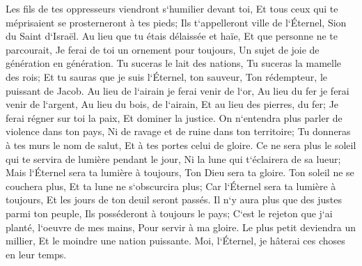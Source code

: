 \verse Les fils de tes oppresseurs viendront s`humilier devant toi, Et tous ceux qui te méprisaient se prosterneront à tes pieds; Ils t`appelleront ville de l`Éternel, Sion du Saint d`Israël. 
\verse Au lieu que tu étais délaissée et haïe, Et que personne ne te parcourait, Je ferai de toi un ornement pour toujours, Un sujet de joie de génération en génération. 
\verse Tu suceras le lait des nations, Tu suceras la mamelle des rois; Et tu sauras que je suis l`Éternel, ton sauveur, Ton rédempteur, le puissant de Jacob. 
\verse Au lieu de l`airain je ferai venir de l`or, Au lieu du fer je ferai venir de l`argent, Au lieu du bois, de l`airain, Et au lieu des pierres, du fer; Je ferai régner sur toi la paix, Et dominer la justice. 
\verse On n`entendra plus parler de violence dans ton pays, Ni de ravage et de ruine dans ton territoire; Tu donneras à tes murs le nom de salut, Et à tes portes celui de gloire. 
\verse Ce ne sera plus le soleil qui te servira de lumière pendant le jour, Ni la lune qui t`éclairera de sa lueur; Mais l`Éternel sera ta lumière à toujours, Ton Dieu sera ta gloire. 
\verse Ton soleil ne se couchera plus, Et ta lune ne s`obscurcira plus; Car l`Éternel sera ta lumière à toujours, Et les jours de ton deuil seront passés. 
\verse Il n`y aura plus que des justes parmi ton peuple, Ils posséderont à toujours le pays; C`est le rejeton que j`ai planté, l`oeuvre de mes mains, Pour servir à ma gloire. 
\verse Le plus petit deviendra un millier, Et le moindre une nation puissante. Moi, l`Éternel, je hâterai ces choses en leur temps. 

